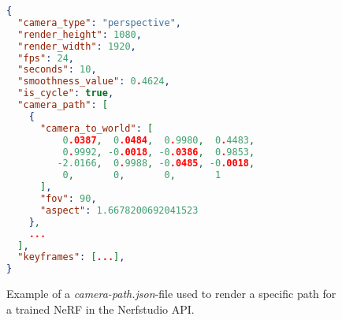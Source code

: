 \begin{figure}[ht]
\centering
\begin{lstlisting}[language=json,linewidth=0.9\linewidth]
{
  "camera_type": "perspective",
  "render_height": 1080,
  "render_width": 1920,
  "fps": 24,
  "seconds": 10,
  "smoothness_value": 0.4624,
  "is_cycle": true,
  "camera_path": [
    {
      "camera_to_world": [
          0.0387,  0.0484,  0.9980,  0.4483,
          0.9992, -0.0018, -0.0386,  0.9853,
         -2.0166,  0.9988, -0.0485, -0.0018,
          0,       0,       0,       1
      ],
      "fov": 90,
      "aspect": 1.6678200692041523
    },
    ...
  ],
  "keyframes": [...],
}

\end{lstlisting}
\caption[Example of a \textit{camera-path.json}-file.]{Example of a \textit{camera-path.json}-file used to render a specific path for a trained NeRF in the Nerfstudio API.}
\label{code:camera-path-example}
\end{figure}

